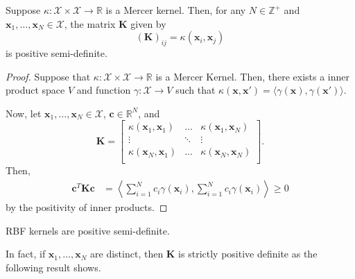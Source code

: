 \begin{lemma}
    Suppose $\kappa: \mathcal{X} \times \mathcal{X} \to \mathbb{R}$ is a Mercer kernel.
    Then, for any $N \in \mathbb{Z}^{+}$ and $\mathbf{x}_1, \dots, \mathbf{x}_N \in \mathcal{X}$, the matrix $\mathbf{K}$
    given by
    \begin{equation*}
        (\mathbf{K})_{ij} = \kappa(\mathbf{x}_i, \mathbf{x}_j)
    \end{equation*}
    is positive semi-definite.
\end{lemma}
\begin{proof}
    Suppose that $\kappa: \mathcal{X} \times \mathcal{X} \to \mathbb{R}$ is a Mercer Kernel.
    Then, there exists a inner product space $V$ and function $\gamma: \mathcal{X} \to V$ such that $\kappa(\mathbf{x}, \mathbf{x}') = \langle\gamma(\mathbf{x}), \gamma(\mathbf{x}')\rangle$.

    Now, let $\mathbf{x}_1, \dots, \mathbf{x}_N \in \mathcal{X}$, $\mathbf{c} \in \mathbb{R}^{N}$, and
    \begin{equation*}
        \mathbf{K} =
        \begin{bmatrix}
            \kappa(\mathbf{x}_1, \mathbf{x}_1) & \dots & \kappa(\mathbf{x}_1, \mathbf{x}_N) \\
            \vdots & \ddots & \vdots \\
            \kappa(\mathbf{x}_N, \mathbf{x}_1) & \dots & \kappa(\mathbf{x}_N, \mathbf{x}_N) \\
        \end{bmatrix}
        .
    \end{equation*}
    Then,
    \begin{align*}
        \mathbf{c}^{T} \mathbf{K} \mathbf{c}
        & = \left\langle \sum_{i = 1}^{N}c_i \gamma(\mathbf{x}_i),
        \sum_{i = 1}^{N}c_i \gamma(\mathbf{x}_i) \right\rangle
        \geq 0
    \end{align*}
    by the positivity of inner products.
\end{proof}

\begin{corollary}
    \label{corr:rbf-psd}
    RBF kernels are positive semi-definite.
\end{corollary}

In fact, if $\mathbf{x}_1, \dots, \mathbf{x}_N$ are distinct, then $\mathbf{K}$ is strictly positive definite as the following result shows.

